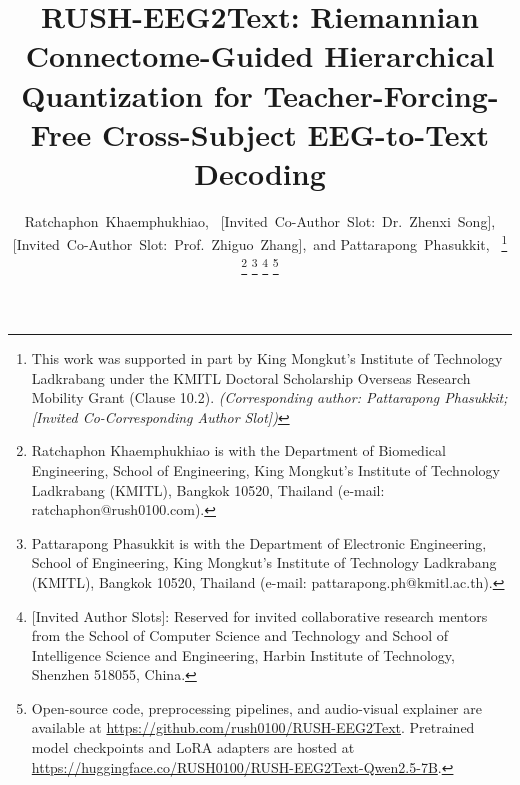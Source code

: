 \documentclass[journal]{IEEEtran}
\begin{document}
\title{RUSH-EEG2Text: Riemannian Connectome-Guided Hierarchical Quantization for Teacher-Forcing-Free Cross-Subject EEG-to-Text Decoding}

\author{
Ratchaphon~Khaemphukhiao,~
{[Invited~Co-Author~Slot:~Dr.~Zhenxi~Song]},\\
{[Invited~Co-Author~Slot:~Prof.~Zhiguo~Zhang]},~and
Pattarapong~Phasukkit,~%
\thanks{This work was supported in part by King Mongkut's Institute of Technology Ladkrabang under the KMITL Doctoral Scholarship Overseas Research Mobility Grant (Clause 10.2). \textit{(Corresponding author: Pattarapong Phasukkit; [Invited Co-Corresponding Author Slot])}}%
\thanks{Ratchaphon Khaemphukhiao is with the Department of Biomedical Engineering, School of Engineering, King Mongkut's Institute of Technology Ladkrabang (KMITL), Bangkok 10520, Thailand (e-mail: ratchaphon@rush0100.com).}%
\thanks{Pattarapong Phasukkit is with the Department of Electronic Engineering, School of Engineering, King Mongkut's Institute of Technology Ladkrabang (KMITL), Bangkok 10520, Thailand (e-mail: pattarapong.ph@kmitl.ac.th).}%
\thanks{{[Invited Author Slots]}: Reserved for invited collaborative research mentors from the School of Computer Science and Technology and School of Intelligence Science and Engineering, Harbin Institute of Technology, Shenzhen 518055, China.}%
\thanks{Open-source code, preprocessing pipelines, and audio-visual explainer are available at \url{https://github.com/rush0100/RUSH-EEG2Text}. Pretrained model checkpoints and LoRA adapters are hosted at \url{https://huggingface.co/RUSH0100/RUSH-EEG2Text-Qwen2.5-7B}.}%
}


\maketitle
\end{document}
